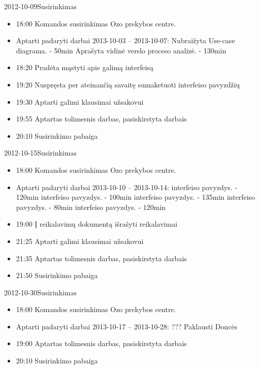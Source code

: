 \begin{loggentry}{2012-10-09}{Susirinkimas}

	\begin{itemize}
		\item 18:00 Komandos susirinkimas Ozo prekybos centre.
		\item Aptarti padaryti darbai 2013-10-03 – 2013-10-07:
			\subitem Nubraižyta Use-case diagrama. - 50min
			\subitem Aprašyta vidinė verslo proceso analizė. - 130min
		\item 18:20 Pradėta mąstyti apie galimą interfeisą
		\item 19:20 Nuspręsta per ateinančią savaitę sumaketuoti interfeiso pavyzdžių
		\item 19:30 Aptarti galimi klausimai užsakovui
		\item 19:55 Aptartas tolimesnis darbas, pasiskirstyta darbais
		\item 20:10 Susirinkimo pabaiga
	\end{itemize}
\end{loggentry}

\begin{loggentry}{2012-10-15}{Susirinkimas}

	\begin{itemize}
		\item 18:00 Komandos susirinkimas Ozo prekybos centre.
		\item Aptarti padaryti darbai 2013-10-10 – 2013-10-14:
			 interfeiso pavyzdys. - 120min
			 interfeiso pavyzdys. - 100min
			 interfeiso pavyzdys. - 135min
			 interfeiso pavyzdys. - 80min
			 interfeiso pavyzdys. - 120min
		\item 19:00 Į reikalavimų dokumentą išrašyti reikalavimai
		\item 21:25 Aptarti galimi klausimai užsakovui
		\item 21:35 Aptartas tolimesnis darbas, pasiskirstyta darbais
		\item 21:50 Susirinkimo pabaiga
	\end{itemize}
\end{loggentry}

\begin{loggentry}{2012-10-30}{Susirinkimas}

	\begin{itemize}
		\item 18:00 Komandos susirinkimas Ozo prekybos centre.
		\item Aptarti padaryti darbai 2013-10-17 – 2013-10-28:
			\subitem ??? Paklausti Doncės
		\item 19:00 Aptartas tolimesnis darbas, pasiskirstyta darbais
		\item 20:10 Susirinkimo pabaiga
	\end{itemize}
\end{loggentry}
